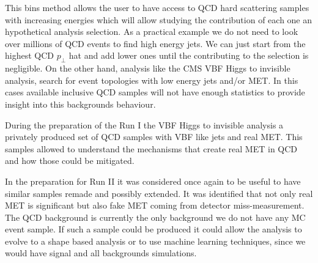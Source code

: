 This bins method allows the user to have access to \gls{QCD} hard scattering samples with increasing energies which will allow studying the contribution of each one an hypothetical analysis selection. As a practical example we do not need to look over millions of \gls{QCD} events to find high energy jets. We can just start from the highest \gls{QCD} $p_\perp$ hat and add lower ones until the contributing to the selection is negligible. On the other hand, analysis like the \gls{CMS} \gls{VBF} Higgs to invisible analysis, search for event topologies with low energy jets and/or \gls{MET}. In this cases available inclusive \gls{QCD} samples will not have enough statistics to provide insight into this backgrounds behaviour. 

During the preparation of the Run I the \gls{VBF} Higgs to invisible analysis a privately produced set of \gls{QCD} samples with \gls{VBF} like jets and real \gls{MET}. This samples allowed to understand the mechanisms that create real \gls{MET} in \gls{QCD} and how those could be mitigated. 

In the preparation for Run II it was considered once again to be useful to have similar samples remade and possibly extended. It was identified that not only real \gls{MET} is significant but also fake \gls{MET} coming from detector miss-measurement. The \gls{QCD} background is currently the only background we do not have any \gls{MC} event sample. If such a sample could be produced it could allow the analysis to evolve to a shape based analysis or to use machine learning techniques, since we would have signal and all backgrounds simulations. 



